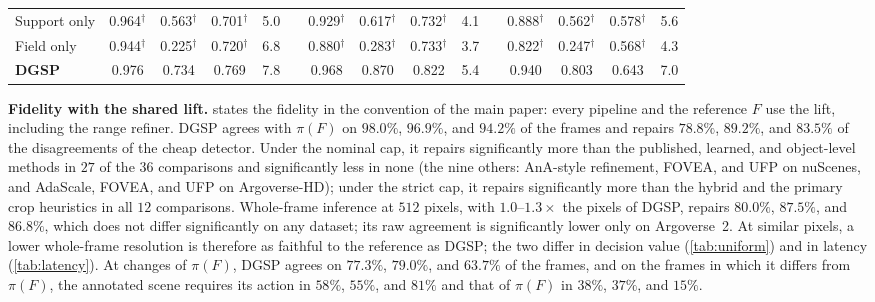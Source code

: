 \documentclass[10pt,letterpaper]{article}
\newcommand{\method}{DGSP\xspace}
\newcommand{\full}{F}
\newcommand{\policy}{\pi}
\newcommand{\oursrow}{\rowcolor{oursbg}}
\theoremstyle{remark}
\theoremstyle{plain}
\theoremstyle{definition}
\begin{document}
\begin{table}[!htbp]
\begin{tabular}{@{}lcccccccccccccc@{}}
Support only & 0.964$^{\dagger}$ & 0.563$^{\dagger}$ & 0.701$^{\dagger}$ & 5.0 &  & 0.929$^{\dagger}$ & 0.617$^{\dagger}$ & 0.732$^{\dagger}$ & 4.1 &  & 0.888$^{\dagger}$ & 0.562$^{\dagger}$ & 0.578$^{\dagger}$ & 5.6 \\
Field only & 0.944$^{\dagger}$ & 0.225$^{\dagger}$ & 0.720$^{\dagger}$ & 6.8 &  & 0.880$^{\dagger}$ & 0.283$^{\dagger}$ & 0.733$^{\dagger}$ & 3.7 &  & 0.822$^{\dagger}$ & 0.247$^{\dagger}$ & 0.568$^{\dagger}$ & 4.3 \\
\midrule
\oursrow \textbf{\method} & 0.976 & 0.734 & 0.769 & 7.8 &  & 0.968 & 0.870 & 0.822 & 5.4 &  & 0.940 & 0.803 & 0.643 & 7.0 \\
\bottomrule
\end{tabular}
\end{table}

\noindent\textbf{Fidelity with the shared lift.}
 states the fidelity in the convention of the main paper: every pipeline and the reference $\full$ use the lift, including the range refiner.
\method agrees with $\policy(\full)$ on $98.0\%$, $96.9\%$, and $94.2\%$ of the frames and repairs $78.8\%$, $89.2\%$, and $83.5\%$ of the disagreements of the cheap detector.
Under the nominal cap, it repairs significantly more than the published, learned, and object-level methods in $27$ of the $36$ comparisons and significantly less in none (the nine others: AnA-style refinement, FOVEA, and UFP on nuScenes, and AdaScale, FOVEA, and UFP on Argoverse-HD); under the strict cap, it repairs significantly more than the hybrid and the primary crop heuristics in all $12$ comparisons.
Whole-frame inference at $512$ pixels, with $1.0$--$1.3\times$ the pixels of \method, repairs $80.0\%$, $87.5\%$, and $86.8\%$, which does not differ significantly on any dataset; its raw agreement is significantly lower only on Argoverse~2.
At similar pixels, a lower whole-frame resolution is therefore as faithful to the reference as \method; the two differ in decision value (\cref{tab:uniform}) and in latency (\cref{tab:latency}).
At changes of $\policy(\full)$, \method agrees on $77.3\%$, $79.0\%$, and $63.7\%$ of the frames, and on the frames in which it differs from $\policy(\full)$, the annotated scene requires its action in $58\%$, $55\%$, and $81\%$ and that of $\policy(\full)$ in $38\%$, $37\%$, and $15\%$.
\end{document}
